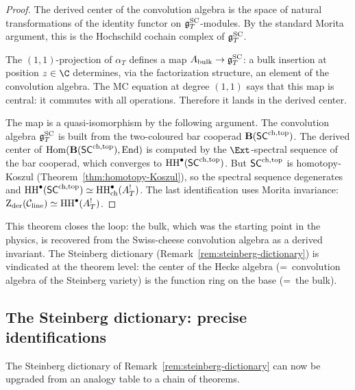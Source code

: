 \begin{proof}
The derived center of the convolution algebra is the space of
natural transformations of the identity functor on $\mathfrak{g}^{\mathrm{SC}}_T$-modules.
By the standard Morita argument, this is the Hochschild cochain
complex of $\mathfrak{g}^{\mathrm{SC}}_T$.

The $(1,1)$-projection of $\alpha_T$ defines a map
$A_{\mathrm{bulk}}\to\mathfrak{g}^{\mathrm{SC}}_T$: a bulk insertion at position $z\in\C$
determines, via the factorization structure, an element of the
convolution algebra. The MC equation at degree $(1,1)$ says
that this map is central: it commutes with all operations.
Therefore it lands in the derived center.

The map is a quasi-isomorphism by the following argument.
The convolution algebra $\mathfrak{g}^{\mathrm{SC}}_T$ is built from the two-coloured
bar cooperad $\mathbf{B}(\mathsf{SC}^{\mathrm{ch,top}})$. The derived center of
$\operatorname{Hom}(\mathbf{B}(\mathsf{SC}^{\mathrm{ch,top}}),\operatorname{End})$ is computed by the
$\Ext$-spectral sequence of the bar cooperad, which converges
to $\operatorname{HH}^\bullet(\mathsf{SC}^{\mathrm{ch,top}})$. But $\mathsf{SC}^{\mathrm{ch,top}}$ is homotopy-Koszul
(Theorem~\ref{thm:homotopy-Koszul}), so the spectral sequence
degenerates and $\operatorname{HH}^\bullet(\mathsf{SC}^{\mathrm{ch,top}})\simeq\operatorname{HH}^\bullet_{\mathrm{ch}}(A^!_T)$.
The last identification uses Morita invariance:
$\operatorname{Z}_{\mathrm{der}}(\mathcal C_{\mathrm{line}})\simeq\operatorname{HH}^\bullet(A^!_T)$.
\end{proof}

\begin{remark}
This theorem closes the loop: the bulk, which was the starting
point in the physics, is recovered from the Swiss-cheese
convolution algebra as a derived invariant. The Steinberg
dictionary (Remark~\ref{rem:steinberg-dictionary}) is vindicated
at the theorem level: the center of the Hecke algebra (=~convolution
algebra of the Steinberg variety) is the function ring on the
base (=~the bulk).
\end{remark}


\subsection{The Steinberg dictionary: precise identifications}

The Steinberg dictionary of Remark~\ref{rem:steinberg-dictionary}
can now be upgraded from an analogy table to a chain of theorems.

